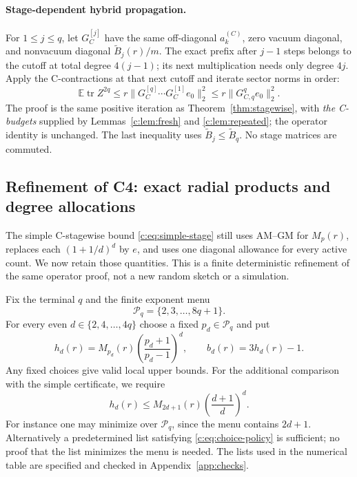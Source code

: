 \documentclass[11pt]{article}
\numberwithin{equation}{section}
\theoremstyle{definition}\newtheorem{definition}[theorem]{Definition}
\theoremstyle{remark}\newtheorem{remark}[theorem]{Remark}
\newcommand{\tr}{\operatorname{tr}}\newcommand{\Ent}{\operatorname{Ent}}
\begin{document}
\paragraph{Stage-dependent hybrid propagation.}
For $1\le j\le q$, let $G_C^{[j]}$ have the same off-diagonal
$a_k^{(C)}$, zero vacuum diagonal, and nonvacuum diagonal
$\widetilde B_j(r)/m$. The exact prefix after $j-1$ steps belongs to the cutoff
at total degree $4(j-1)$; its next multiplication needs only degree $4j$.
Apply the C-contractions at that next cutoff and iterate sector norms in order:
\begin{equation}\label{c:eq:simple-stage}
 \mathbb E\tr Z^{2q}
 \le r\|G_C^{[q]}\cdots G_C^{[1]}e_0\|_2^2
 \le r\|G_{C,q}^{q}e_0\|_2^2.
\end{equation}
The proof is the same positive iteration as Theorem~\ref{thm:stagewise}, with
\emph{the C-budgets} supplied by Lemmas~\ref{c:lem:fresh} and
\ref{c:lem:repeated}; the operator identity is unchanged. The last inequality
uses $\widetilde B_j\le\widetilde B_q$. No stage matrices are commuted.

\subsection{Refinement of C4: exact radial products and degree allocations}
\label{c:sec:refined}
The simple C-stagewise bound \eqref{c:eq:simple-stage} still uses AM--GM for $M_p(r)$, replaces each
$(1+1/d)^d$ by $e$, and uses one diagonal allowance for every active count.
We now retain those quantities. This is a finite deterministic refinement of
the same operator proof, not a new random sketch or a simulation.

Fix the terminal $q$ and the finite exponent menu
\[
 \mathcal P_q=\{2,3,\ldots,8q+1\}.
\]
For every even $d\in\{2,4,\ldots,4q\}$ choose a fixed $p_d\in\mathcal P_q$ and put
\begin{equation}\label{c:eq:wick-degree-cost}
 h_d(r)=M_{p_d}(r)\left(\frac{p_d+1}{p_d-1}\right)^d,
 \qquad b_d(r)=3h_d(r)-1.
\end{equation}
Any fixed choices give valid local upper bounds. For the additional comparison
with the simple certificate, we require
\begin{equation}\label{c:eq:choice-policy}
 h_d(r)\le M_{2d+1}(r)\left(\frac{d+1}{d}\right)^d.
\end{equation}
For instance one may minimize over $\mathcal P_q$, since the menu contains
$2d+1$. Alternatively a predetermined list satisfying \eqref{c:eq:choice-policy}
is sufficient; no proof that the list minimizes the menu is needed. The lists
used in the numerical table are specified and checked in Appendix~\ref{app:checks}.
\end{document}
